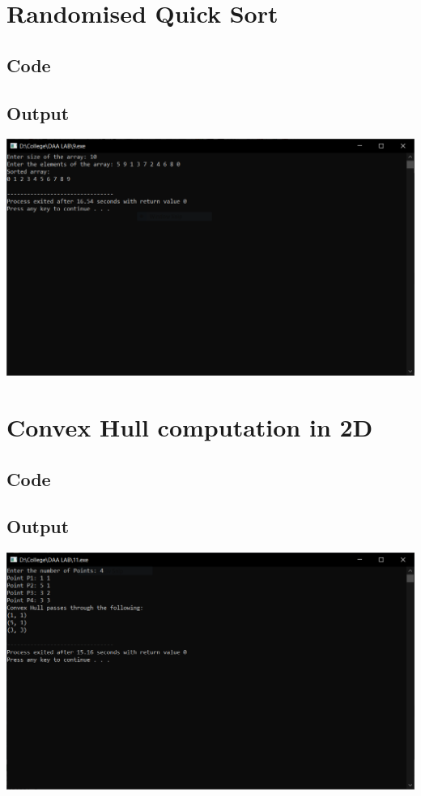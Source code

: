 \documentclass[11pt]{article}
\begin{document}
\section{Randomised Quick Sort}
	\subsection{Code}
		
	\subsection{Output}
		\includegraphics[scale=0.7]{pic/9.png}
\newpage









\section{Convex Hull computation in 2D}
	\subsection{Code}
		
	\subsection{Output}
		\includegraphics[scale=0.7]{pic/10.png}
\newpage
\end{document}
